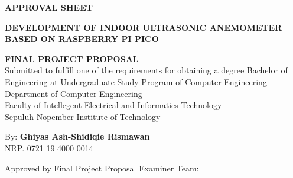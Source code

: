 \begin{center}
	\large
  \textbf{APPROVAL SHEET}
\end{center}

\thispagestyle{empty}

\begin{center}
  \textbf{DEVELOPMENT OF INDOOR ULTRASONIC ANEMOMETER BASED ON RASPBERRY PI PICO}
\end{center}

\begingroup
  \small

  \begin{center}
    \textbf{FINAL PROJECT PROPOSAL} \\
    Submitted to fulfill one of the requirements for obtaining a degree
    Bachelor of Engineering at 
    Undergraduate Study Program of Computer Engineering \\
    Department of Computer Engineering \\
    Faculty of Intellegent Electrical and Informatics Technology \\
    Sepuluh Nopember Institute of Technology
  \end{center}

  \begin{center}
    By: \textbf{Ghiyas Ash-Shidiqie Rismawan} \\
    NRP. 0721 19 4000 0014
  \end{center}

  \begin{center}
    Approved by Final Project Proposal Examiner Team:
  \end{center}

  \begingroup
    \setlength{\tabcolsep}{0pt}

